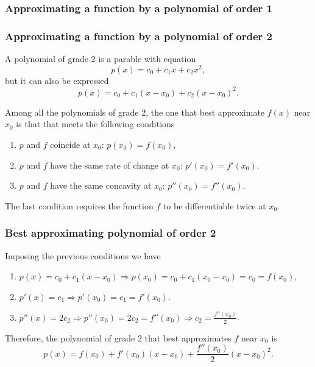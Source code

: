 \begin{frame}
\frametitle{Approximating a function by a polynomial of order 1}
\begin{center}

\end{center}
\end{frame}


\begin{frame}
\frametitle{Approximating a function by a polynomial of order 2}
A polynomial of grade 2 is a parable with equation
\[
p(x) = c_0+c_1x+c_2x^2,
\]
but it can also be expressed
\[
p(x) = c_0+c_1(x-x_0)+c_2(x-x_0)^2.
\]

Among all the polynomials of grade 2, the one that best approximate $f(x)$ near $x_0$ is that that meets the following conditions
\begin{enumerate}
\item $p$ and $f$ coincide at $x_0$: $p(x_0) = f(x_0)$,
\item $p$ and $f$ have the same rate of change at $x_0$: $p'(x_0) = f'(x_0)$.
\item $p$ and $f$ have the same concavity at $x_0$: $p''(x_0)=f''(x_0)$.
\end{enumerate}
The last condition requires the function $f$ to be differentiable twice at $x_0$.
\end{frame}


\begin{frame}
\frametitle{Best approximating polynomial of order 2}
Imposing the previous conditions we have
\begin{enumerate}
\item $p(x)=c_0+c_1(x-x_0) \Rightarrow p(x_0)=c_0+c_1(x_0-x_0)=c_0=f(x_0)$,
\item $p'(x)=c_1 \Rightarrow p'(x_0)=c_1=f'(x_0)$.
\item $p''(x)=2c_2 \Rightarrow p''(x_0)=2c_2=f''(x_0) \Rightarrow c_2=\frac{f''(x_0)}{2}$.
\end{enumerate}

Therefore, the polynomial of grade 2 that best approximates $f$ near $x_0$ is
\[
p(x) = f(x_0)+f'(x_0)(x-x_0)+\frac{f''(x_0)}{2}(x-x_0)^2.
\]
\end{frame}


